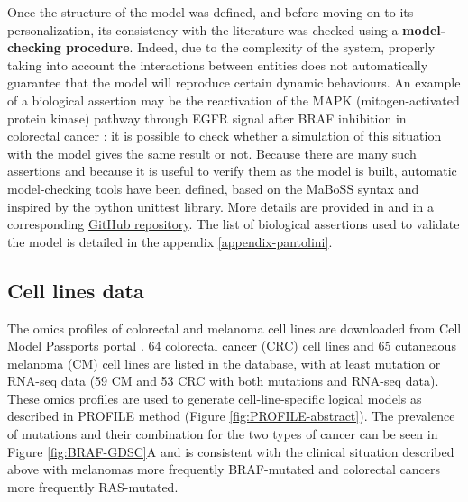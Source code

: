 \documentclass[a4paper,12pt,twoside,onecolumn,openright,final,oldfontcommands]{memoir}
\begin{document}
Once the structure of the model was defined, and before moving on to its
personalization, its consistency with the literature was checked using a
\textbf{model-checking procedure}. Indeed, due to the complexity of the
system, properly taking into account the interactions between entities
does not automatically guarantee that the model will reproduce certain
dynamic behaviours. An example of a biological assertion may be the
reactivation of the MAPK (mitogen-activated protein kinase) pathway
through EGFR signal after BRAF inhibition in colorectal cancer
\citep{prahallad2012unresponsiveness}: it is possible to check whether a
simulation of this situation with the model gives the same result or
not. Because there are many such assertions and because it is useful to
verify them as the model is built, automatic model-checking tools have
been defined, based on the MaBoSS syntax and inspired by the python
unittest library. More details are provided in
\citet{beal2020personalized} and in a corresponding
\href{https://github.com/sysbio-curie/MaBoSS_test}{GitHub repository}.
The list of biological assertions used to validate the model is detailed
in the appendix \ref{appendix-pantolini}.

\subsection{Cell lines data}\label{cell-lines-data}

The omics profiles of colorectal and melanoma cell lines are downloaded
from Cell Model Passports portal \citep{van2019cell}. 64 colorectal
cancer (CRC) cell lines and 65 cutaneaous melanoma (CM) cell lines are
listed in the database, with at least mutation or RNA-seq data (59 CM
and 53 CRC with both mutations and RNA-seq data). These omics profiles
are used to generate cell-line-specific logical models as described in
PROFILE method (Figure \ref{fig:PROFILE-abstract}). The prevalence of
mutations and their combination for the two types of cancer can be seen
in Figure \ref{fig:BRAF-GDSC}A and is consistent with the clinical
situation described above with melanomas more frequently BRAF-mutated
and colorectal cancers more frequently RAS-mutated.
\end{document}
